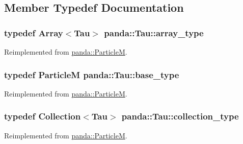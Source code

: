 \subsection{Member Typedef Documentation}
\hypertarget{classpanda_1_1Tau_a74a1cb1b70bdd2212670492156eecc50}{
\subsubsection[{array\_\-type}]{\setlength{\rightskip}{0pt plus 5cm}typedef {\bf Array}$<${\bf Tau}$>$ {\bf panda::Tau::array\_\-type}}}
\label{classpanda_1_1Tau_a74a1cb1b70bdd2212670492156eecc50}


Reimplemented from \hyperlink{classpanda_1_1ParticleM_a1ba36e35f5cd6a26decfbaa815678d2a}{panda::ParticleM}.\hypertarget{classpanda_1_1Tau_aeeec56f6b40c4aa834d50e298430fdb4}{
\subsubsection[{base\_\-type}]{\setlength{\rightskip}{0pt plus 5cm}typedef {\bf ParticleM} {\bf panda::Tau::base\_\-type}}}
\label{classpanda_1_1Tau_aeeec56f6b40c4aa834d50e298430fdb4}


Reimplemented from \hyperlink{classpanda_1_1ParticleM_a134d640b78531bc47ddb19ba490de07d}{panda::ParticleM}.\hypertarget{classpanda_1_1Tau_a4998ea28667acf331fa5dd9e9decdcda}{
\subsubsection[{collection\_\-type}]{\setlength{\rightskip}{0pt plus 5cm}typedef {\bf Collection}$<${\bf Tau}$>$ {\bf panda::Tau::collection\_\-type}}}
\label{classpanda_1_1Tau_a4998ea28667acf331fa5dd9e9decdcda}


Reimplemented from \hyperlink{classpanda_1_1ParticleM_ae39fbe234c21960d067e8790541d0d68}{panda::ParticleM}.

